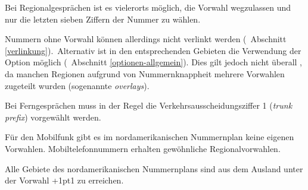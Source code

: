 \documentclass[numbers=noenddot]{scrreprt}
\newcommand\KeineVerlinkung{Nummern ohne Vorwahl können allerdings nicht verlinkt werden
\vglAbschnitt{verlinkung}.}
\newcommand*\vglAbschnitt[1]{(\cf\ Abschnitt \ref{#1})}
\begin{document}
Bei Regionalgesprächen ist es vielerorts möglich, die Vorwahl wegzulassen und nur die letzten sieben Ziffern der Nummer zu wählen.
\begin{sidebyside}
\end{sidebyside}
\KeineVerlinkung\ Alternativ ist in den entsprechenden Gebieten die Verwendung der Option  möglich
\vglAbschnitt{optionen-allgemein}. Dies gilt jedoch nicht überall \cite{NANPA-ten-digit}, da manchen Regionen aufgrund von Nummernknappheit mehrere Vorwahlen zugeteilt wurden (sogenannte \emph{overlays}).

Bei Ferngesprächen muss in der Regel die Verkehrsausscheidungsziffer 1 (\emph{trunk prefix}) vorgewählt werden.
\begin{sidebyside}
\end{sidebyside}

Für den Mobilfunk gibt es im nordamerikanischen Nummernplan keine eigenen Vorwahlen. Mobiltelefonnummern erhalten gewöhnliche Regionalvorwahlen.

Alle Gebiete des nordamerikanischen Nummernplans sind aus dem Ausland unter der Vorwahl +\kern1pt1 zu erreichen.
\begin{sidebyside}
\end{sidebyside}
\end{document}
